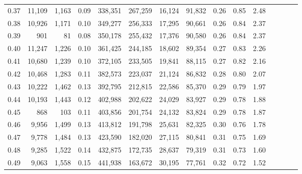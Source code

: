 \begin{tabular}{rrrcrrrrrrrrrrr}
0.37 &  11,109 &  1,163 &                                       0.09 &  338,351 &  267,259 &   16,124 &   91,832 &  0.26 &  0.85 &                         2.48 \\
0.38 &  10,926 &  1,171 &                                       0.10 &  349,277 &  256,333 &   17,295 &   90,661 &  0.26 &  0.84 &                         2.37 \\
0.39 &     901 &     81 &                                       0.08 &  350,178 &  255,432 &   17,376 &   90,580 &  0.26 &  0.84 &                         2.37 \\
0.40 &  11,247 &  1,226 &                                       0.10 &  361,425 &  244,185 &   18,602 &   89,354 &  0.27 &  0.83 &                         2.26 \\
0.41 &  10,680 &  1,239 &                                       0.10 &  372,105 &  233,505 &   19,841 &   88,115 &  0.27 &  0.82 &                         2.16 \\
0.42 &  10,468 &  1,283 &                                       0.11 &  382,573 &  223,037 &   21,124 &   86,832 &  0.28 &  0.80 &                         2.07 \\
0.43 &  10,222 &  1,462 &                                       0.13 &  392,795 &  212,815 &   22,586 &   85,370 &  0.29 &  0.79 &                         1.97 \\
0.44 &  10,193 &  1,443 &                                       0.12 &  402,988 &  202,622 &   24,029 &   83,927 &  0.29 &  0.78 &                         1.88 \\
0.45 &     868 &    103 &                                       0.11 &  403,856 &  201,754 &   24,132 &   83,824 &  0.29 &  0.78 &                         1.87 \\
0.46 &   9,956 &  1,499 &                                       0.13 &  413,812 &  191,798 &   25,631 &   82,325 &  0.30 &  0.76 &                         1.78 \\
0.47 &   9,778 &  1,484 &                                       0.13 &  423,590 &  182,020 &   27,115 &   80,841 &  0.31 &  0.75 &                         1.69 \\
0.48 &   9,285 &  1,522 &                                       0.14 &  432,875 &  172,735 &   28,637 &   79,319 &  0.31 &  0.73 &                         1.60 \\
0.49 &   9,063 &  1,558 &                                       0.15 &  441,938 &  163,672 &   30,195 &   77,761 &  0.32 &  0.72 &                         1.52 \\

\end{tabular}
